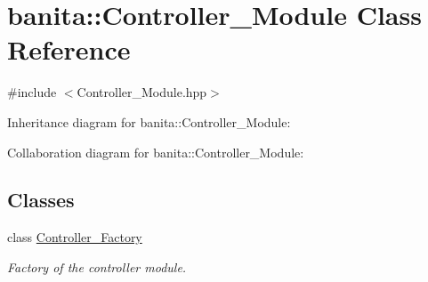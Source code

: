 \hypertarget{classbanita_1_1_controller___module}{}\section{banita\+::Controller\+\_\+\+Module Class Reference}
\label{classbanita_1_1_controller___module}


{\ttfamily \#include $<$Controller\+\_\+\+Module.\+hpp$>$}



Inheritance diagram for banita\+::Controller\+\_\+\+Module\+:


Collaboration diagram for banita\+::Controller\+\_\+\+Module\+:
\subsection*{Classes}
\begin{DoxyCompactItemize}
\item 
class \mbox{\hyperlink{classbanita_1_1_controller___module_1_1_controller___factory}{Controller\+\_\+\+Factory}}
\begin{DoxyCompactList}\small\item\em Factory of the controller module. \end{DoxyCompactList}\end{DoxyCompactItemize}
